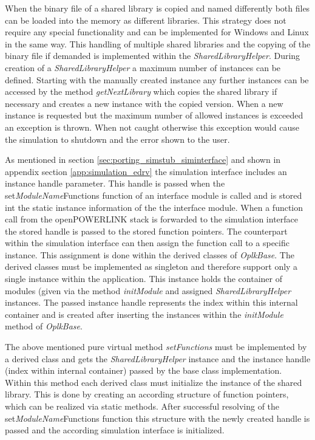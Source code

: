 When the binary file of a shared library is copied and named differently both files can be loaded into the memory as different libraries.
This strategy does not require any special functionality and can be implemented for Windows and Linux in the same way.
This handling of multiple shared libraries and the copying of the binary file if demanded is implemented within the \emph{SharedLibraryHelper}.
During creation of a \emph{SharedLibraryHelper} a maximum number of instances can be defined.
Starting with the manually created instance any further instances can be accessed by the method \emph{getNextLibrary} which copies the shared library if necessary and creates a new instance with the copied version.
When a new instance is requested but the maximum number of allowed instances is exceeded an exception is thrown.
When not caught otherwise this exception would cause the simulation to shutdown and the error shown to the user.

As mentioned in section \ref{sec:porting_simstub_siminterface} and shown in appendix section \ref{app:simulation_edrv} the simulation interface includes an instance handle parameter.
This handle is passed when the set\emph{ModuleName}Functions function of an interface module is called and is stored int the static instance information of the the interface module.
When a function call from the openPOWERLINK stack is forwarded to the simulation interface the stored handle is passed to the stored function pointers.
The counterpart within the simulation interface can then assign the function call to a specific instance.
This assignment is done within the derived classes of \emph{OplkBase}.
The derived classes must be implemented as singleton and therefore support only a single instance within the application.
This instance holds the container of modules (given via the method \emph{initModule} and assigned \emph{SharedLibraryHelper} instances.
The passed instance handle represents the index within this internal container and is created after inserting the instances within the \emph{initModule} method of \emph{OplkBase}.

The above mentioned pure virtual method \emph{setFunctions} must be implemented by a derived class and gets the \emph{SharedLibraryHelper} instance and the instance handle (index within internal container) passed by the base class implementation.
Within this method each derived class must initialize the instance of the shared library.
This is done by creating an according structure of function pointers, which can be realized via static methods.
After successful resolving of the set\emph{ModuleName}Functions function this structure with the newly created handle is passed and the according simulation interface is initialized.

